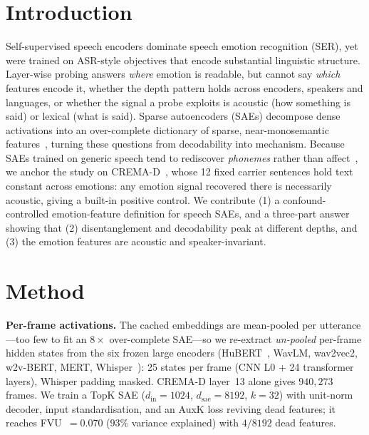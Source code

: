 \documentclass[sigconf,anonymous,nonacm]{acmart}
\begin{document}
\section{Introduction}
Self-supervised speech encoders dominate speech emotion recognition (SER), yet were trained on ASR-style objectives that encode substantial linguistic structure. Layer-wise probing answers \emph{where} emotion is readable, but cannot say \emph{which} features encode it, whether the depth pattern holds across encoders, speakers and languages, or whether the signal a probe exploits is acoustic (how something is said) or lexical (what is said). Sparse autoencoders (SAEs) decompose dense activations into an over-complete dictionary of sparse, near-monosemantic features~\cite{gao2024scaling,saelens}, turning these questions from decodability into mechanism. Because SAEs trained on generic speech tend to rediscover \emph{phonemes} rather than affect~\cite{saeasr2026}, we anchor the study on CREMA-D~\cite{cao2014cremad}, whose 12 fixed carrier sentences hold text constant across emotions: any emotion signal recovered there is necessarily acoustic, giving a built-in positive control. We contribute (1) a confound-controlled emotion-feature definition for speech SAEs, and a three-part answer showing that (2) disentanglement and decodability peak at different depths, and (3) the emotion features are acoustic and speaker-invariant.

\section{Method}
\textbf{Per-frame activations.}
The cached embeddings are mean-pooled per utterance---too few to fit an $8\times$ over-complete SAE---so we re-extract \emph{un-pooled} per-frame hidden states from the six frozen large encoders (HuBERT~\cite{hsu2021hubert}, WavLM, wav2vec2, w2v-BERT, MERT, Whisper~\cite{radford2023whisper}): 25 states per frame (CNN L0 + 24 transformer layers), Whisper padding masked. CREMA-D layer~13 alone gives $940{,}273$ frames. We train a TopK SAE ($d_{\text{in}}{=}1024$, $d_{\text{sae}}{=}8192$, $k{=}32$) with unit-norm decoder, input standardisation, and an AuxK loss reviving dead features; it reaches FVU~$=0.070$ ($93\%$ variance explained) with $4/8192$ dead features.
\end{document}
